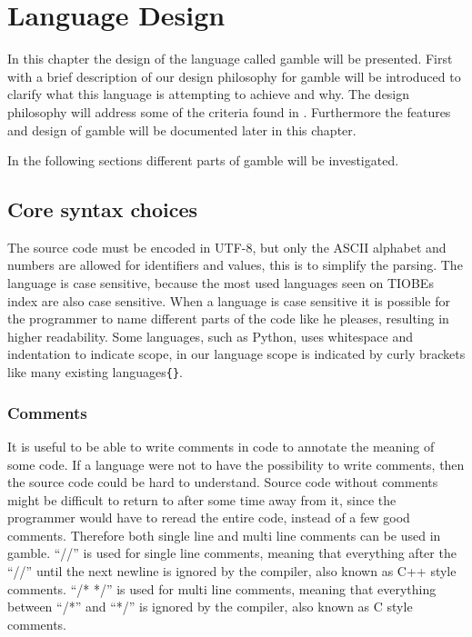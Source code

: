 \chapter{Language Design}
\label{cha:Design}
In this chapter the design of the language called \gls{gamble} will be presented.
First with a brief description of our design philosophy for \gls{gamble} will be introduced to clarify what this language is attempting to achieve and why.
The design philosophy will address some of the criteria found in .
Furthermore the features and design of \gls{gamble} will be documented later in this chapter.



In the following sections different parts of \gls{gamble} will be investigated.

\section{Core syntax choices}
The source code must be encoded in UTF-8, but only the ASCII alphabet and numbers are allowed for identifiers and values, this is to simplify the parsing. 
The language is case sensitive, because the most used languages seen on TIOBEs index\citep{TIOBE} are also case sensitive.
When a language is case sensitive it is possible for the programmer to name different parts of the code like he pleases, resulting in higher readability.
Some languages, such as Python, uses whitespace and indentation to indicate scope, in our language scope is indicated by curly brackets like many existing languages\texttt{\{\}}.  

\subsection*{Comments}
It is useful to be able to write comments in code to annotate the meaning of some code.
If a language were not to have the possibility to write comments, then the source code could be hard to understand.
Source code without comments might be difficult to return to after some time away from it, since the programmer would have to reread the entire code, instead of a few good comments.\citep{Commenting}
Therefore both single line and multi line comments can be used in \gls{gamble}. 
``//'' is used for single line comments, meaning that everything after the ``//'' until the next newline is ignored by the compiler, also known as C++ style comments. 
``/* */'' is used for multi line comments, meaning that everything between ``/*'' and ``*/'' is ignored by the compiler, also known as C style comments. 

